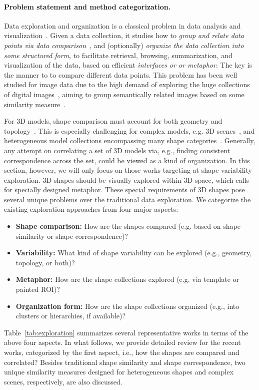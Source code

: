 \paragraph*{Problem statement and method categorization.}
Data exploration and organization is a classical problem in data analysis and visualization~\cite{Paulovich:2011:PLP}.
Given a data collection, it studies how to \emph{group and relate data points via data comparison}~\cite{Oliveira:2003:VDE},
and (optionally) \emph{organize the data collection into some structured form},
to facilitate retrieval, browsing, summarization, and visualization of the data, based on efficient \emph{interfaces or or metaphor}.
The key is the manner to to compare different data points.
This problem has been well studied for image data due to the high demand of
exploring the huge collections of digital images~\cite{Cooper:2005:QOC,Snavely:2006:PT},
aiming to group semantically related images based on some similarity measure~\cite{Nguyen:2008:IAL}.

For 3D models, shape comparison must account for both geometry and topology~\cite{Tangelder:2008:SCB}.
This is especially challenging for complex models, e.g. 3D scenes~\cite{Xu:2014:OHSC},
and heterogeneous model collections encompassing many shape categories~\cite{Huang:2013:QOC}.
%
Generally, any attempt on correlating a set of 3D models via, e.g., finding consistent correspondence across the set,
could be viewed as a kind of organization.
In this section, however, we will only focus on those works targeting at shape variability exploration.
3D shapes should be visually explored within 3D space, which calls for specially designed metaphor.
%
These special requirements of 3D shapes pose several unique problems over the traditional data exploration.
We categorize the existing exploration approaches from four major aspects:
\begin{itemize}
\item \textbf{Shape comparison:} How are the shapes compared (e.g. based on shape similarity or shape correspondence)?
\item \textbf{Variability:} What kind of shape variability can be explored (e.g., geometry, topology, or both)?
\item \textbf{Metaphor:} How are the shape collections explored (e.g. via template or painted ROI)?
\item \textbf{Organization form:} How are the shape collections organized (e.g., into clusters or hierarchies, if available)?
\end{itemize}
Table~\ref{tab:exploration} summarizes several representative works in terms of the above four aspects.
In what follows, we provide detailed review for the recent works, categorized by the first aspect, i.e.,
how the shapes are compared and correlated? Besides traditional shape similarity and shape correspondence,
two unique similarity measures designed for heterogeneous shapes and complex scenes, respectively, are also discussed.

